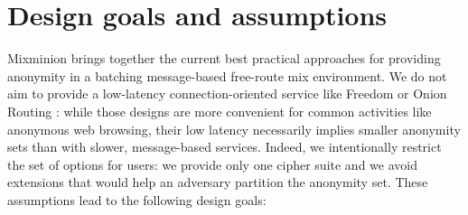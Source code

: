 \documentclass[final,inpress,inline]{ieee}
\begin{document}





\section{Design goals and assumptions}
\label{sec:assumptions}

Mixminion brings together the current best practical approaches
for providing anonymity in a batching message-based free-route mix
environment. We do not aim to provide a low-latency connection-oriented
service like Freedom \cite{freedom} or Onion Routing \cite{goldschlag99}:
while those designs are more convenient for common activities like
anonymous web browsing, their low latency necessarily implies smaller
anonymity sets than with slower, message-based services. Indeed, we
intentionally restrict the set of options for users: we provide only one
cipher suite and we avoid extensions that would help an adversary partition
the anonymity set. These assumptions lead to the following design goals:
\end{document}
